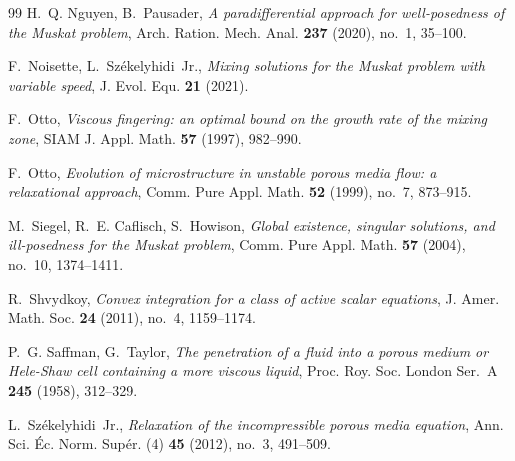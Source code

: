 \begin{thebibliography}{99}
H.~Q. Nguyen, B.~Pausader, \emph{A paradifferential approach for well-posedness of the Muskat problem}, Arch. Ration. Mech. Anal. \textbf{237} (2020), no.~1, 35--100.

F.~Noisette, L.~Sz\'ekelyhidi~Jr., \emph{Mixing solutions for the Muskat problem with variable speed}, J. Evol. Equ. \textbf{21} (2021).

F.~Otto, \emph{Viscous fingering: an optimal bound on the growth rate of the mixing zone}, SIAM J. Appl. Math. \textbf{57} (1997), 982--990.

F.~Otto, \emph{Evolution of microstructure in unstable porous media flow: a relaxational approach}, Comm. Pure Appl. Math. \textbf{52} (1999), no.~7, 873--915.

M.~Siegel, R.~E. Caflisch, S.~Howison, \emph{Global existence, singular solutions, and ill-posedness for the Muskat problem}, Comm. Pure Appl. Math. \textbf{57} (2004), no.~10, 1374--1411.

R.~Shvydkoy, \emph{Convex integration for a class of active scalar equations}, J. Amer. Math. Soc. \textbf{24} (2011), no.~4, 1159--1174.

P.~G. Saffman, G.~Taylor, \emph{The penetration of a fluid into a porous medium or Hele-Shaw cell containing a more viscous liquid}, Proc. Roy. Soc. London Ser.~A \textbf{245} (1958), 312--329.

L.~Sz\'ekelyhidi~Jr., \emph{Relaxation of the incompressible porous media equation}, Ann. Sci. \'Ec. Norm. Sup\'er. (4) \textbf{45} (2012), no.~3, 491--509.

\end{thebibliography}
